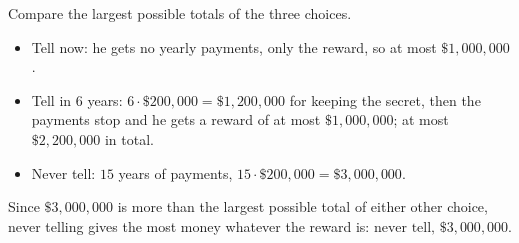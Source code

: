 Compare the largest possible totals of the three choices.
\begin{itemize}
\item Tell now: he gets no yearly payments, only the reward, so at most $\$1{,}000{,}000$.
\item Tell in $6$ years: $6\cdot\$200{,}000=\$1{,}200{,}000$ for keeping the secret, then the payments stop and he gets a reward of at most $\$1{,}000{,}000$; at most $\$2{,}200{,}000$ in total.
\item Never tell: $15$ years of payments, $15\cdot\$200{,}000=\$3{,}000{,}000$.
\end{itemize}
Since $\$3{,}000{,}000$ is more than the largest possible total of either other choice, never telling gives the most money whatever the reward is: $\boxed{\text{never tell, }\$3{,}000{,}000}$.

